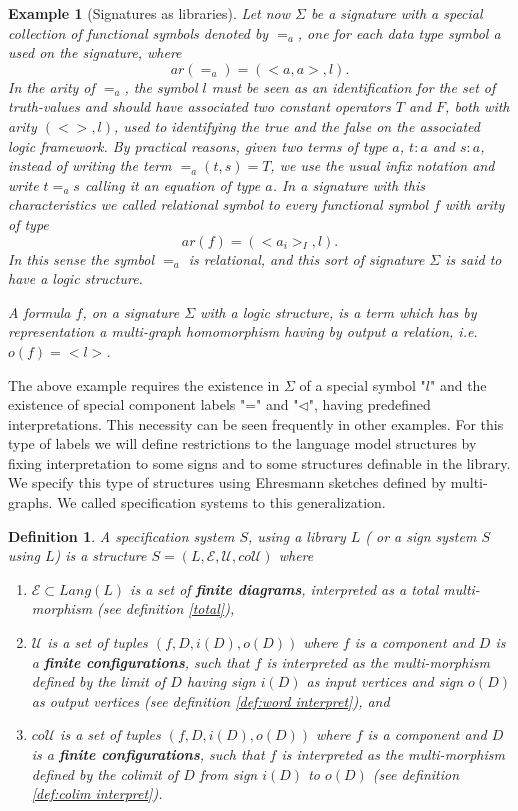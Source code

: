 \documentclass[oribibl]{llncs}
\newtheorem{defn}{Definition}
\newtheorem{exam}{Example}
\newcommand{\E}{\mathcal{E}}
\newcommand{\U}{\mathcal{U}}
\begin{document}
\begin{exam}[Signatures as libraries]
Let now $\Sigma$  be a signature with a special collection of
functional symbols denoted by $=_a$, one for each data type symbol a
used on the signature, where \[ar(=_a)=(<a,a>,l).\] In the arity of
$=_a$, the symbol $l$ must be seen as an identification for the set
of truth-values and should have associated two constant operators
$T$ and $F$, both with arity $(<>,l)$, used to identifying the true
and the false on the associated logic framework. By practical
reasons, given two terms of type $a$, $t:a$ and $s:a$, instead of
writing the term $=_a(t,s)=T$, we use the usual infix notation and
write $t=_as$ calling it an equation of type $a$. In a signature
with this characteristics we called relational symbol to every
functional symbol $f$ with arity of type \[ar(f)=(<a_i>_I,l).\] In
this sense the symbol $=_a$ is relational, and this sort of
signature $\Sigma$ is said to have a logic structure.

A formula $f$, on a signature $\Sigma$ with a logic structure, is a
term which has by representation a multi-graph
homomorphism having by output a relation, i.e. $o(f)=<l>$.
\end{exam}

The above example requires the existence in $\Sigma$ of a special symbol "$l$" and the existence of special component labels "="
and "$\lhd$", having predefined interpretations. This necessity can be seen frequently in other examples. For this type of labels we will define restrictions to the language  model structures by fixing interpretation to some signs and to some structures definable in the library.  We specify this type of structures using Ehresmann sketches defined by multi-graphs. We called  specification systems to this generalization.

\begin{defn}
A \emph{specification system} $S$, using a library $L$ ( or a
\emph{sign system} $S$ using $L$) is a structure $S=(L,\E,\U,co\U)$
where
\begin{enumerate}
  \item $\E\subset Lang(L)$ is a set of \textbf{finite diagrams}, interpreted as a total multi-morphism (see definition \ref{total}),
  \item $\U$ is a set of tuples $(f,D,i(D),o(D))$ where $f$ is a component and $D$ is a \textbf{finite configurations}, such that $f$ is interpreted as the multi-morphism defined by the limit of $D$ having sign $i(D)$ as input vertices and sign $o(D)$ as output vertices (see definition \ref{def:word interpret}), and
  \item $co\U$ is a set of tuples $(f,D,i(D),o(D))$ where $f$ is a component and $D$ is a \textbf{finite configurations}, such that $f$ is interpreted as the multi-morphism defined by the colimit of $D$ from sign $i(D)$ to $o(D)$ (see definition \ref{def:colim interpret}).
\end{enumerate}
\end{defn}
\end{document}
